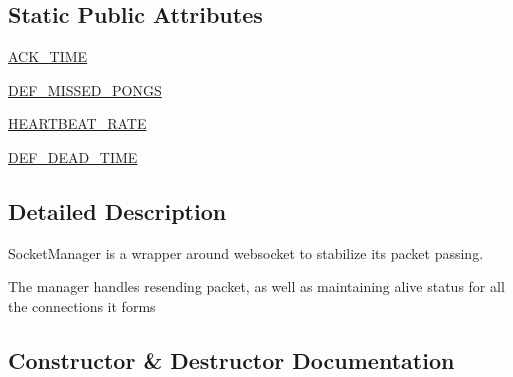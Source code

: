 \subsection*{Static Public Attributes}
\begin{DoxyCompactItemize}
\item 
\hyperlink{classparlai_1_1mturk_1_1core_1_1socket__manager_1_1SocketManager_ad170381c2941af2fc6273559402ff22f}{A\+C\+K\+\_\+\+T\+I\+ME}
\item 
\hyperlink{classparlai_1_1mturk_1_1core_1_1socket__manager_1_1SocketManager_a057fdcc6941e8aef40af1b12d7a24572}{D\+E\+F\+\_\+\+M\+I\+S\+S\+E\+D\+\_\+\+P\+O\+N\+GS}
\item 
\hyperlink{classparlai_1_1mturk_1_1core_1_1socket__manager_1_1SocketManager_a397c2f186e18af9a720f084047b66672}{H\+E\+A\+R\+T\+B\+E\+A\+T\+\_\+\+R\+A\+TE}
\item 
\hyperlink{classparlai_1_1mturk_1_1core_1_1socket__manager_1_1SocketManager_aa33dad44c7c32e6ed95a868c39dc727e}{D\+E\+F\+\_\+\+D\+E\+A\+D\+\_\+\+T\+I\+ME}
\end{DoxyCompactItemize}


\subsection{Detailed Description}
\begin{DoxyVerb}SocketManager is a wrapper around websocket to stabilize its packet passing.

The manager handles resending packet, as well as maintaining alive status for all
the connections it forms
\end{DoxyVerb}
 

\subsection{Constructor \& Destructor Documentation}
\mbox{\label{classparlai_1_1mturk_1_1core_1_1socket__manager_1_1SocketManager_ad366f39cbef4d0d8307cf350cd088ff9}} 
